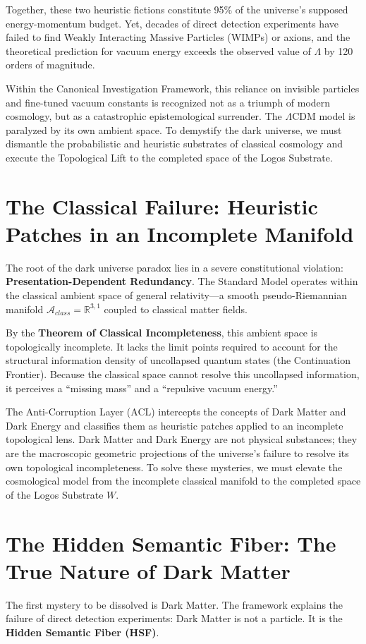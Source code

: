 \documentclass[12pt,twoside]{extbook}
\theoremstyle{definition}
\theoremstyle{remark}
\newcommand{\term}[1]{\textcolor{brandPrimary}{\textbf{#1}}}
\begin{document}
Together, these two heuristic fictions constitute 95\% of the universe's supposed energy-momentum budget. Yet, decades of direct detection experiments have failed to find Weakly Interacting Massive Particles (WIMPs) or axions, and the theoretical prediction for vacuum energy exceeds the observed value of $\Lambda$ by 120 orders of magnitude. 

Within the Canonical Investigation Framework, this reliance on invisible particles and fine-tuned vacuum constants is recognized not as a triumph of modern cosmology, but as a catastrophic epistemological surrender. The $\Lambda$CDM model is paralyzed by its own ambient space. To demystify the dark universe, we must dismantle the probabilistic and heuristic substrates of classical cosmology and execute the Topological Lift to the completed space of the Logos Substrate.

\section{The Classical Failure: Heuristic Patches in an Incomplete Manifold}
The root of the dark universe paradox lies in a severe constitutional violation: \term{Presentation-Dependent Redundancy}. The Standard Model operates within the classical ambient space of general relativity—a smooth pseudo-Riemannian manifold $\mathcal{A}_{class} = \mathbb{R}^{3,1}$ coupled to classical matter fields. 

By the \term{Theorem of Classical Incompleteness}, this ambient space is topologically incomplete. It lacks the limit points required to account for the structural information density of uncollapsed quantum states (the Continuation Frontier). Because the classical space cannot resolve this uncollapsed information, it perceives a ``missing mass'' and a ``repulsive vacuum energy.'' 

The Anti-Corruption Layer (ACL) intercepts the concepts of Dark Matter and Dark Energy and classifies them as heuristic patches applied to an incomplete topological lens. Dark Matter and Dark Energy are not physical substances; they are the macroscopic geometric projections of the universe's failure to resolve its own topological incompleteness. To solve these mysteries, we must elevate the cosmological model from the incomplete classical manifold to the completed space of the Logos Substrate $W$.

\section{The Hidden Semantic Fiber: The True Nature of Dark Matter}
The first mystery to be dissolved is Dark Matter. The framework explains the failure of direct detection experiments: Dark Matter is not a particle. It is the \term{Hidden Semantic Fiber (HSF)}.
\end{document}
